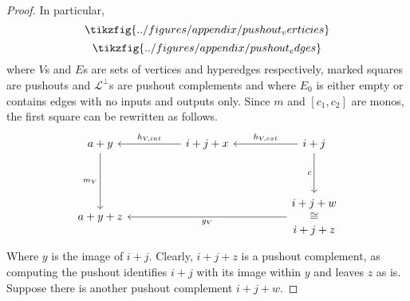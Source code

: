 \begin{proof}
        In particular,
    \[
        \tikzfig{../figures/appendix/pushout_verticies}
    \]
    \[
        \tikzfig{../figures/appendix/pushout_edges}
    \]
    where $V$s and $E$s are sets of vertices and hyperedges respectively, marked squares are pushouts and $\mathcal{L}^{\bot}$s are pushout complements and where $E_{0}$ is either empty or contains edges with no inputs and outputs only.
    Since $m$ and $[c_1,c_2]$ are monos, the first square can be rewritten as follows.
\[\begin{tikzcd}
	{a + y} && {i + j + x} && {i+j} \\
	\\
	{a + y + z} &&&& {\begin{matrix} i + j + w \\ \cong \\ i + j + z \end{matrix}}
	\arrow["{h_{V,ext}}"', from=1-5, to=1-3]
	\arrow["{h_{V,int}}"', from=1-3, to=1-1]
	\arrow["{m_{V}}"', from=1-1, to=3-1]
	\arrow["{g_{V}}", from=3-5, to=3-1]
	\arrow["c"', from=1-5, to=3-5]
\end{tikzcd}\]
    Where $y$ is the image of $i + j$. Clearly, $i + j + z$ is a pushout complement, as computing the pushout identifies $i + j$ with its image within $y$ and leaves $z$ as is.
    Suppose there is another pushout complement $i + j + w$.

\end{proof}
